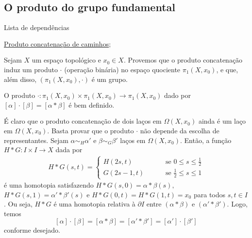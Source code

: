 \subsection{O produto do grupo fundamental} %
\label{produto-bem-definido-prop}
\begin{titlemize}{Lista de dependências}
	\item \hyperref[Produto-concatenacao-def]{Produto concatenação de caminhos};\\ %
\end{titlemize}
Sejam $X$ um espaço topológico e $x_0\in X$. Provemos que o produto concatenação induz um produto $\cdot$ (operação binária) no espaço quociente $\pi_1(X,x_0)$, e que, além disso, $(\pi_1(X,x_0),\cdot)$ é um grupo.

\begin{lemma}%
    O produto $\cdot:\pi_1(X,x_0)\times\pi_1(X,x_0)\rightarrow \pi_1(X,x_0)$ dado por $[\alpha]\cdot[\beta]=[\alpha*\beta]$ é bem definido.
\end{lemma}

\begin{dem}
    É claro que o produto concatenação de dois laços em $\Omega(X,x_0)$ ainda é um laço em $\Omega(X,x_0)$. Basta provar que o produto $\cdot$ não depende da escolha de representantes. Sejam $\alpha\sim_H \alpha'$ e $\beta\sim_G\beta'$ laços em $\Omega(X,x_0)$. Então, a função $H*G:I\times I\rightarrow X$ dada por 
    \begin{align*}
        H*G(s,t)=\begin{cases}
            H(2s,t)\qquad&\mbox{ se }0\le s\le \frac{1}{2}\\
            G(2s-1,t)\qquad&\mbox{ se }\frac{1}{2}\le s\le1
        \end{cases}
    \end{align*}
    é uma homotopia satisfazendo $H*G(s,0)=\alpha*\beta(s),$ $H*G(s,1)=\alpha'*\beta'(s)$ e $H*G(0,t)=H*G(1,t)=x_0$ para todos $s,t\in I$. Ou seja, $H*G$ é uma homotopia relativa à $\partial I$ entre $(\alpha*\beta)$ e $(\alpha'*\beta').$ Logo, temos  
    $$[\alpha]\cdot[\beta]=[\alpha*\beta]=[\alpha'*\beta']=[\alpha']\cdot [\beta']$$
    conforme desejado.
\end{dem}

